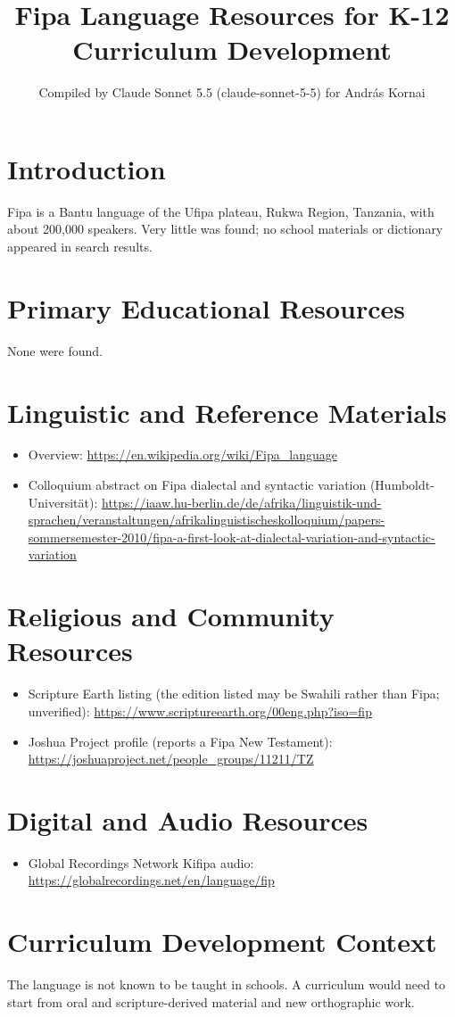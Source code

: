 \documentclass[12pt]{article}
\title{Fipa Language Resources for K-12 Curriculum Development}
\author{Compiled by Claude Sonnet 5.5 (claude-sonnet-5-5) for Andr\'as Kornai}
\date{}
\begin{document}
\maketitle
\section{Introduction}
Fipa is a Bantu language of the Ufipa plateau, Rukwa Region, Tanzania, with about 200,000 speakers. Very little was found; no school materials or dictionary appeared in search results.
\section{Primary Educational Resources}
None were found.
\section{Linguistic and Reference Materials}
\begin{itemize}
\item Overview: \url{https://en.wikipedia.org/wiki/Fipa_language}
\item Colloquium abstract on Fipa dialectal and syntactic variation (Humboldt-Universit\"at): \url{https://iaaw.hu-berlin.de/de/afrika/linguistik-und-sprachen/veranstaltungen/afrikalinguistischeskolloquium/papers-sommersemester-2010/fipa-a-first-look-at-dialectal-variation-and-syntactic-variation}
\end{itemize}
\section{Religious and Community Resources}
\begin{itemize}
\item Scripture Earth listing (the edition listed may be Swahili rather than Fipa; unverified): \url{https://www.scriptureearth.org/00eng.php?iso=fip}
\item Joshua Project profile (reports a Fipa New Testament): \url{https://joshuaproject.net/people_groups/11211/TZ}
\end{itemize}
\section{Digital and Audio Resources}
\begin{itemize}
\item Global Recordings Network Kifipa audio: \url{https://globalrecordings.net/en/language/fip}
\end{itemize}
\section{Curriculum Development Context}
The language is not known to be taught in schools. A curriculum would need to start from oral and scripture-derived material and new orthographic work.
\end{document}

